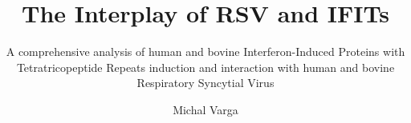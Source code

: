 \title{The Interplay of RSV and IFITs}

    \subtitle{A comprehensive analysis of human and bovine Interferon-Induced Proteins with Tetratricopeptide Repeats induction and interaction with human and bovine Respiratory Syncytial Virus}

\author{Michal Varga}






